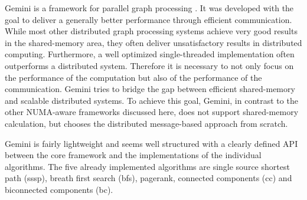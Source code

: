 
Gemini is a framework for parallel graph processing \cite{Gemini}. It was developed with the goal to deliver a generally better performance through efficient communication. While most other distributed graph processing systems achieve very good results in the shared-memory area, they often deliver unsatisfactory results in distributed computing. Furthermore, a well optimized single-threaded implementation often outperforms a distributed system. Therefore it is necessary to not only focus on the performance of the computation but also of the performance of the communication. Gemini tries to bridge the gap between efficient shared-memory and scalable distributed systems. To achieve this goal, Gemini, in contrast to the other NUMA-aware frameworks discussed here, does not support shared-memory calculation, but chooses the distributed message-based approach from scratch.

Gemini is fairly lightweight and seems well structured with a clearly defined API between the core framework and the implementations of the individual algorithms. The five already implemented algorithms are single source shortest path (sssp), breath first search (bfs), pagerank, connected components (cc) and biconnected components (bc).
